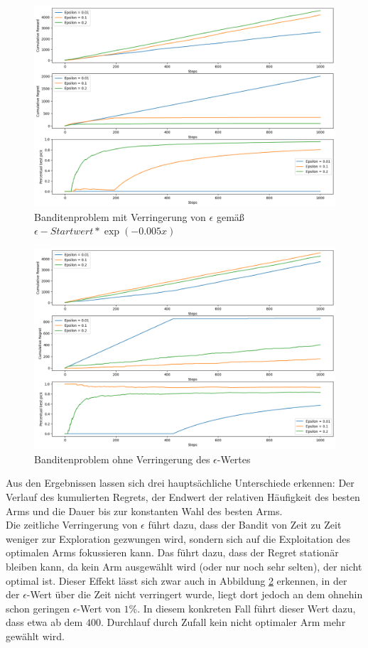 \documentclass[11pt]{article}
\begin{document}
\begin{figure}[h]
    \centering
    \includegraphics[width = \textwidth]{img/1_1d.png}
    \caption{Banditenproblem mit Verringerung von $\epsilon$ gemäß $\epsilon-Startwert * \exp(-0.005x)$}
    \label{img:1_1d}
\end{figure}
\begin{figure}[h]
    \includegraphics[width = \textwidth]{img/1_1d2.png}
    \caption{Banditenproblem ohne Verringerung des $\epsilon$-Wertes}
    \label{img:1_1d2}
\end{figure}
Aus den Ergebnissen lassen sich drei hauptsächliche Unterschiede erkennen: Der Verlauf des kumulierten Regrets, der Endwert der relativen Häufigkeit des besten Arms und die Dauer bis zur konstanten Wahl des besten Arms.\\
Die zeitliche Verringerung von $\epsilon$ führt dazu, dass der Bandit von Zeit zu Zeit weniger zur Exploration gezwungen wird, sondern sich auf die Exploitation des optimalen Arms fokussieren kann. Das führt dazu, dass der Regret stationär bleiben kann, da kein Arm ausgewählt wird (oder nur noch sehr selten), der nicht optimal ist. Dieser Effekt lässt sich zwar auch in Abbildung \ref{img:1_1d2} erkennen, in der der $\epsilon$-Wert über die Zeit nicht verringert wurde, liegt dort jedoch an dem ohnehin schon geringen $\epsilon$-Wert von $1\%$. In diesem konkreten Fall führt dieser Wert dazu, dass etwa ab dem $400.$ Durchlauf durch Zufall kein nicht optimaler Arm mehr gewählt wird.\\
\end{document}
